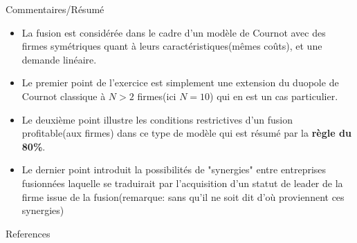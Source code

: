 \documentclass[notes, ignorenonframetext, compress, 10pt, xcolor=svgnames, aspectratio=169]{beamer}
\begin{document}
    \begin{frame}[allowframebreaks]{Commentaires/Résumé}
    \begin{itemize}
        \item La fusion est considérée dans le cadre d'un modèle de Cournot avec des firmes
         symétriques quant à leurs caractéristiques(mêmes coûts), et une demande linéaire. 
        \item Le premier point de l'exercice est simplement une extension du duopole 
        de Cournot classique à $N>2$ firmes(ici $N = 10$) qui en est un cas particulier. 
        \item Le deuxième point illustre les conditions restrictives 
        d'un fusion profitable(aux firmes) dans ce type de modèle qui est résumé par la \textbf{règle du 80\%}. 
        \item Le dernier point introduit la possibilités de "synergies" entre 
        entreprises fusionnées laquelle se traduirait par l'acquisition d'un 
        statut de leader de la firme issue de la fusion(remarque: 
        sans qu'il ne soit dit d'où proviennent ces synergies)
    \end{itemize}
    \end{frame}
\begin{frame}[allowframebreaks]{References}
    
    
    \end{frame}
    
    
\end{document}
